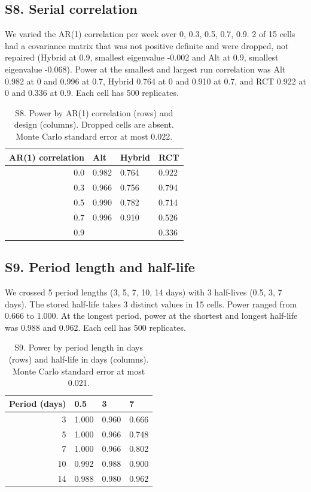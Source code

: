 \documentclass[
  11pt,
]{article}
\begin{document}
\subsection{S8. Serial correlation}\label{s8.-serial-correlation}

We varied the AR(1) correlation per week over 0, 0.3, 0.5, 0.7, 0.9. 2 of 15 cells had a covariance matrix that was not positive definite and were dropped, not repaired (Hybrid at 0.9, smallest eigenvalue -0.002 and Alt at 0.9, smallest eigenvalue -0.068). Power at the smallest and largest run correlation was Alt 0.982 at 0 and 0.996 at 0.7, Hybrid 0.764 at 0 and 0.910 at 0.7, and RCT 0.922 at 0 and 0.336 at 0.9. Each cell has 500 replicates.

\begin{table}

\caption{\label{tab:s8-tab}S8. Power by AR(1) correlation (rows) and design (columns). Dropped cells are absent. Monte Carlo standard error at most 0.022.}
\centering
\begin{tabular}[t]{rlll}
\toprule
AR(1) correlation & Alt & Hybrid & RCT\\
\midrule
0.0 & 0.982 & 0.764 & 0.922\\
0.3 & 0.966 & 0.756 & 0.794\\
0.5 & 0.990 & 0.782 & 0.714\\
0.7 & 0.996 & 0.910 & 0.526\\
0.9 &  &  & 0.336\\
\bottomrule
\end{tabular}
\end{table}

\subsection{S9. Period length and half-life}\label{s9.-period-length-and-half-life}

We crossed 5 period lengths (3, 5, 7, 10, 14 days) with 3 half-lives (0.5, 3, 7 days). The stored half-life takes 3 distinct values in 15 cells. Power ranged from 0.666 to 1.000. At the longest period, power at the shortest and longest half-life was 0.988 and 0.962. Each cell has 500 replicates.

\begin{table}

\caption{\label{tab:s9-tab}S9. Power by period length in days (rows) and half-life in days (columns). Monte Carlo standard error at most 0.021.}
\centering
\begin{tabular}[t]{rlll}
\toprule
Period (days) & 0.5 & 3 & 7\\
\midrule
3 & 1.000 & 0.960 & 0.666\\
5 & 1.000 & 0.966 & 0.748\\
7 & 1.000 & 0.966 & 0.802\\
10 & 0.992 & 0.988 & 0.900\\
14 & 0.988 & 0.980 & 0.962\\
\bottomrule
\end{tabular}
\end{table}
\end{document}
